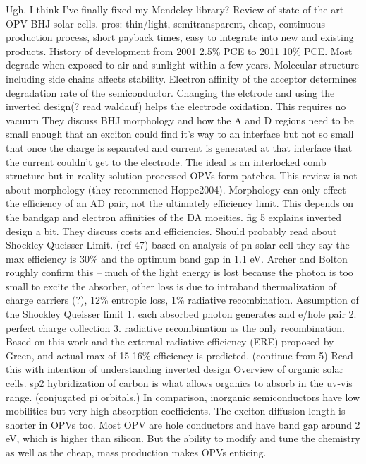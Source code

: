 \documentclass{article}
\begin{document}
Ugh. I think I've finally fixed my Mendeley library?
\cite{Scharber2013}
Review of state-of-the-art OPV BHJ solar cells. 
pros: thin/light, semitransparent, cheap, continuous production process, short payback times, easy to integrate into new and existing products. 
History of development from 2001 2.5\% PCE to 2011 10\% PCE. Most degrade when exposed to air and sunlight within a few years. Molecular structure including side chains affects stability. Electron affinity of the acceptor determines degradation rate of the semiconductor. Changing the elctrode and using the inverted design(? read waldauf) helps the electrode oxidation. This requires no vacuum
They discuss BHJ morphology and how the A and D regions need to be small enough that an exciton could find it's way to an interface but not so small that once the charge is separated and current is generated at that interface that the current couldn't get to the electrode. The ideal is an interlocked comb structure but in reality solution processed OPVs form patches. This review is not about morphology (they recommened Hoppe2004). Morphology can only effect the efficiency of an AD pair, not the ultimately efficiency limit. This depends on the bandgap and electron affinities of the DA moeities.
fig 5 explains inverted design a bit. 
They discuss costs and efficiencies. Should probably read about Shockley Queisser Limit. (ref 47) based on analysis of pn solar cell they say the max efficiency is 30\% and the optimum band gap in 1.1 eV. Archer and Bolton roughly confirm this -- much of the light energy is lost because the photon is too small to excite the absorber, other loss is due to intraband thermalization of charge carriers (?), 12\% entropic loss, 1\% radiative recombination. Assumption of the Shockley Queisser limit
1. each absorbed photon generates and e/hole pair
2. perfect charge collection
3. radiative recombination as the only recombination.
Based on this work and the external radiative efficiency (ERE) proposed by Green, and actual max of 15-16\% efficiency is predicted.
(continue from 5)
\cite{Waldauf2006}
Read this with intention of understanding inverted design
\cite{Hoppe2004}
Overview of organic solar cells. sp2 hybridization of carbon is what allows organics to absorb in the uv-vis range. (conjugated pi orbitals.) In comparison, inorganic semiconductors have low mobilities but very high absorption coefficients. The exciton diffusion length is shorter in OPVs too.
Most OPV are hole conductors and have band gap around 2 eV, which is higher than silicon. But the ability to modify and tune the chemistry as well as the cheap, mass production makes OPVs enticing.
\end{document}
